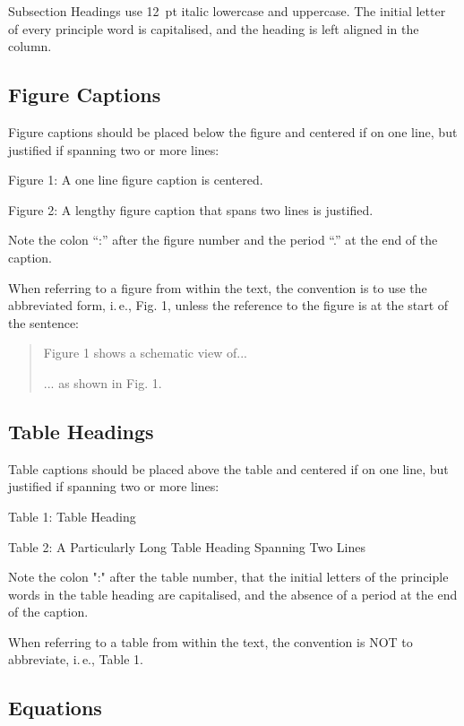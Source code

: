 \documentclass[a4paper,
              ]{jacow}
\begin{document}
Subsection Headings use \SI{12}{pt} italic lowercase and uppercase.
The initial letter of every principle word is capitalised,
and the heading is left aligned in the column.

\subsection{Figure Captions}

Figure captions should be placed below the figure and
centered if on one line, but justified if spanning two or
more lines:
\begin{center}
	Figure 1: A one line figure caption is centered.
\end{center}
\begin{justify}
	Figure 2: A lengthy figure caption that spans 
	two lines is justified.
\end{justify}
Note the colon “:” after the figure number and the period
“.” at the end of the caption.

\newpage

When referring to a figure from within the text, the
convention is to use the abbreviated form, i.\,e., Fig. 1,
unless the reference to the figure is at the start of the sentence:
\begin{quote}
	Figure 1 shows a schematic view of...
	
	... as shown in Fig. 1.
\end{quote}

\subsection{Table Headings}

Table captions should be placed above the table and
centered if on one line, but justified if spanning two or
more lines:
\begin{center}
	Table 1: Table Heading
\end{center}
\begin{justify}
	Table 2: A Particularly Long Table Heading 
	Spanning Two Lines
\end{justify}

Note the colon ":" after the table number, that the initial
letters of the principle words in the table heading are
capitalised, and the absence of a period at the end of the
caption.

When referring to a table from within the text, the convention
is NOT to abbreviate, i.\,e., Table 1.

\subsection{Equations}
\end{document}
